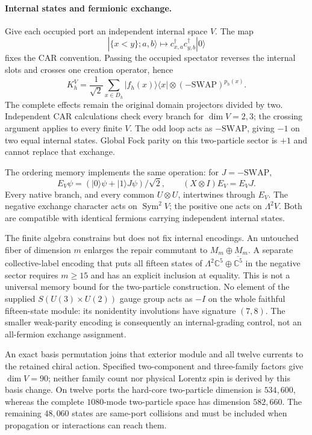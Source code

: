 \paragraph{Internal states and fermionic exchange.}
Give each occupied port an independent internal space $V$. The map
\[
 |\{x<y\};a,b\rangle\longmapsto
 c^\dagger_{x,a}c^\dagger_{y,b}|0\rangle
\]
fixes the CAR convention. Passing the occupied spectator reverses the
internal slots and crosses one creation operator, hence
\[
 K_h^V=\frac1{\sqrt2}\sum_{x\in D_h}
 |f_h(x)\rangle\langle x|\otimes(-\mathrm{SWAP})^{p_h(x)}.
\]
The complete effects remain the original domain projectors divided by
two. Independent CAR calculations check every branch for $\dim V=2,3$;
the crossing argument applies to every finite $V$. The odd loop acts as
$-\mathrm{SWAP}$, giving $-1$ on two equal internal states. Global Fock
parity on this two-particle sector is $+1$ and cannot replace that exchange.

The ordering memory implements the same operation: for $J=-\mathrm{SWAP}$,
\[
 E_V\psi=(|0\rangle\psi+|1\rangle J\psi)/\sqrt2,
 \qquad (X\otimes I)E_V=E_VJ.
\]
Every native branch, and every common $U\otimes U$, intertwines through
$E_V$. The negative exchange character acts on $\operatorname{Sym}^2V$;
the positive one acts on $\Lambda^2V$. Both are compatible with identical
fermions carrying independent internal states.

The finite algebra constrains but does not fix internal encodings.
An untouched fiber of dimension $m$ enlarges the repair commutant to
$M_m\oplus M_m$. A separate collective-label encoding that puts all fifteen
states of $\Lambda^2\mathbb C^5\oplus\overline{\mathbb C^5}$ in the negative
sector requires $m\ge15$ and has an explicit inclusion at equality.
This is not a universal memory bound for the two-particle construction.
No element of the supplied $S(U(3)\times U(2))$ gauge group acts as $-I$
on the whole faithful fifteen-state module: its nonidentity involutions
have signature $(7,8)$. The smaller weak-parity encoding is consequently
an internal-grading control, not an all-fermion exchange assignment.

An exact basis permutation joins that exterior module and all twelve
currents to the retained chiral action. Specified two-component and
three-family factors give $\dim V=90$; neither family count nor physical
Lorentz spin is derived by this basis change. On twelve ports the
hard-core two-particle dimension is $534{,}600$, whereas the complete
$1080$-mode two-particle space has dimension $582{,}660$. The remaining
$48{,}060$ states are same-port collisions and must be included when
propagation or interactions can reach them.

